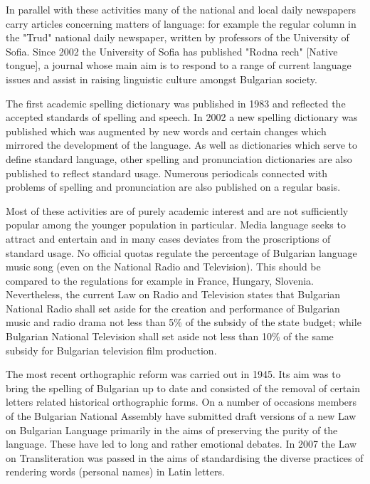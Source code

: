 \begin{multicols}{2}
In parallel with these activities many of the national and local daily newspapers carry articles concerning matters of language: for example the regular column in the "Trud" national daily newspaper, written by professors of the University of Sofia. Since 2002 the University of Sofia has published "Rodna rech" [Native tongue], a journal whose main aim is to respond to a range of current language issues and assist in raising linguistic culture amongst Bulgarian society. 

The first academic spelling dictionary was published in 1983 and reflected the accepted standards of spelling and speech. In 2002 a new spelling dictionary was published which was augmented by new words and certain changes which mirrored the development of the language. As well as dictionaries which serve to define standard language, other spelling and pronunciation dictionaries are also published to reflect standard usage. Numerous periodicals connected with problems of spelling and pronunciation are also published on a regular basis. 

Most of these activities are of purely academic interest and are not sufficiently popular among the younger population in particular. Media language seeks to attract and entertain and in many cases deviates from the proscriptions of standard usage. No official quotas regulate the percentage of Bulgarian language music song (even on the National Radio and Television). This should be compared to the regulations for example in France, Hungary, Slovenia. Nevertheless, the current Law on Radio and Television states that Bulgarian National Radio shall set aside for the creation and performance of Bulgarian music and radio drama not less than 5\% of the subsidy of the state budget; while Bulgarian National Television shall set aside not less than 10\% of the same subsidy for Bulgarian television film production. 

The most recent orthographic reform was carried out in 1945. Its aim was to bring the spelling of Bulgarian up to date and consisted of the removal of certain letters related historical orthographic forms. On a number of occasions members of the Bulgarian National Assembly have submitted draft versions of a new Law on Bulgarian Language primarily in the aims of preserving the purity of the language. These have led to long and rather emotional debates. In 2007 the Law on Transliteration was passed in the aims of standardising the diverse practices of rendering words (personal names) in Latin letters.


\end{multicols}
